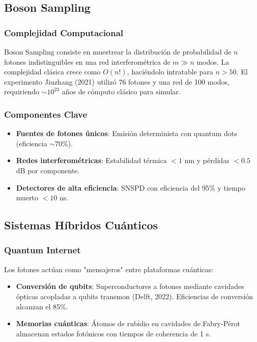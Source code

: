 \documentclass{article}
\begin{document}
\subsection*{Boson Sampling}

\subsubsection*{Complejidad Computacional}

Boson Sampling consiste en muestrear la distribución de probabilidad de $n$ fotones indistinguibles en una red interferométrica de $m \gg n$ modos. La complejidad clásica crece como $O(n!)$, haciéndolo intratable para $n > 50$. El experimento Jiuzhang (2021) utilizó 76 fotones y una red de 100 modos, requiriendo $\sim 10^{23}$ años de cómputo clásico para simular.

\subsubsection*{Componentes Clave}

\begin{itemize}
    \item \textbf{Fuentes de fotones únicos}: Emisión determinista con quantum dots (eficiencia $\sim 70\%$).
    \item \textbf{Redes interferométricas}: Estabilidad térmica $<1$ nm y pérdidas $<0.5$ dB por componente.
    \item \textbf{Detectores de alta eficiencia}: SNSPD con eficiencia del 95\% y tiempo muerto $<10$ ns.
\end{itemize}

\subsection*{Sistemas Híbridos Cuánticos}

\subsubsection*{Quantum Internet}

Los fotones actúan como "mensajeros" entre plataformas cuánticas:
\begin{itemize}
    \item \textbf{Conversión de qubits}: Superconductores a fotones mediante cavidades ópticas acopladas a qubits transmon (Delft, 2022). Eficiencias de conversión alcanzan el 85\%.
    \item \textbf{Memorias cuánticas}: Átomos de rubidio en cavidades de Fabry-Pérot almacenan estados fotónicos con tiempos de coherencia de 1 s.
\end{itemize}
\end{document}
